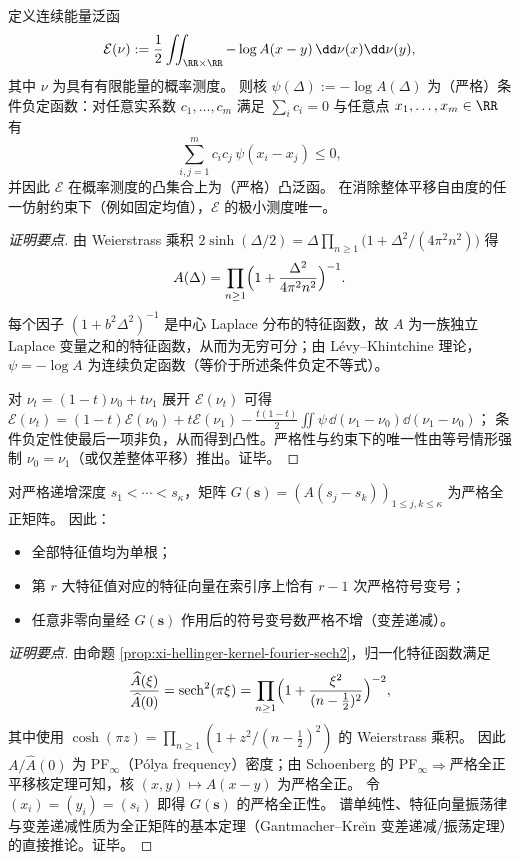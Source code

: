 \begin{proposition}\label{prop:xi-hellinger-energy-functional-strict-convexity}
定义连续能量泛函
\[
\mathcal E(\nu):=\frac12\iint_{\RR\times\RR} -\log A(x-y)\,\dd\nu(x)\dd\nu(y),
\]
其中 \(\nu\) 为具有有限能量的概率测度。
则核 \(\psi(\Delta):=-\log A(\Delta)\) 为（严格）条件负定函数：对任意实系数 \(c_1,\dots,c_m\) 满足 \(\sum_i c_i=0\) 与任意点 \(x_1,\dots,x_m\in\RR\) 有
\[
\sum_{i,j=1}^{m}c_ic_j\,\psi(x_i-x_j)\le 0,
\]
并因此 \(\mathcal E\) 在概率测度的凸集合上为（严格）凸泛函。
在消除整体平移自由度的任一仿射约束下（例如固定均值），\(\mathcal E\) 的极小测度唯一。
\end{proposition}
\begin{proof}[证明要点]
由 Weierstrass 乘积
\(
2\sinh(\Delta/2)=\Delta\prod_{n\ge 1}\bigl(1+\Delta^2/(4\pi^2n^2)\bigr)
\)
得
\[
A(\Delta)=\prod_{n\ge 1}\Bigl(1+\frac{\Delta^2}{4\pi^2n^2}\Bigr)^{-1}.
\]
每个因子 \((1+b^2\Delta^2)^{-1}\) 是中心 Laplace 分布的特征函数，故 \(A\) 为一族独立 Laplace 变量之和的特征函数，从而为无穷可分；由 L\'evy--Khintchine 理论，\(\psi=-\log A\) 为连续负定函数（等价于所述条件负定不等式）。
\par
对 \(\nu_t=(1-t)\nu_0+t\nu_1\) 展开 \(\mathcal E(\nu_t)\) 可得
\(
\mathcal E(\nu_t)=(1-t)\mathcal E(\nu_0)+t\mathcal E(\nu_1)-\frac{t(1-t)}{2}\iint \psi\,\dd(\nu_1-\nu_0)\dd(\nu_1-\nu_0)
\)；
条件负定性使最后一项非负，从而得到凸性。严格性与约束下的唯一性由等号情形强制 \(\nu_0=\nu_1\)（或仅差整体平移）推出。证毕。
\end{proof}

\begin{theorem}\label{thm:xi-hellinger-gram-strict-total-positivity}
对严格递增深度 \(s_1<\cdots<s_\kappa\)，矩阵 \(G(\mathbf s)=(A(s_j-s_k))_{1\le j,k\le\kappa}\) 为严格全正矩阵。
因此：
\begin{itemize}
\item 全部特征值均为单根；
\item 第 \(r\) 大特征值对应的特征向量在索引序上恰有 \(r-1\) 次严格符号变号；
\item 任意非零向量经 \(G(\mathbf s)\) 作用后的符号变号数严格不增（变差递减）。
\end{itemize}
\end{theorem}
\begin{proof}[证明要点]
由命题 \ref{prop:xi-hellinger-kernel-fourier-sech2}，归一化特征函数满足
\[
\frac{\widehat A(\xi)}{\widehat A(0)}=\mathrm{sech}^{2}(\pi\xi)
=\prod_{n\ge 1}\Bigl(1+\frac{\xi^{2}}{(n-\tfrac12)^{2}}\Bigr)^{-2},
\]
其中使用 \(\cosh(\pi z)=\prod_{n\ge 1}(1+z^{2}/(n-\tfrac12)^{2})\) 的 Weierstrass 乘积。
因此 \(A/\widehat A(0)\) 为 PF\(_\infty\)（P\'olya frequency）密度；由 Schoenberg 的 PF\(_\infty\)\(\Rightarrow\)严格全正平移核定理可知，核 \((x,y)\mapsto A(x-y)\) 为严格全正。
令 \((x_i)=(y_i)=(s_i)\) 即得 \(G(\mathbf s)\) 的严格全正性。
谱单纯性、特征向量振荡律与变差递减性质为全正矩阵的基本定理（Gantmacher--Kre\u{\i}n 变差递减/振荡定理）的直接推论。证毕。
\end{proof}

